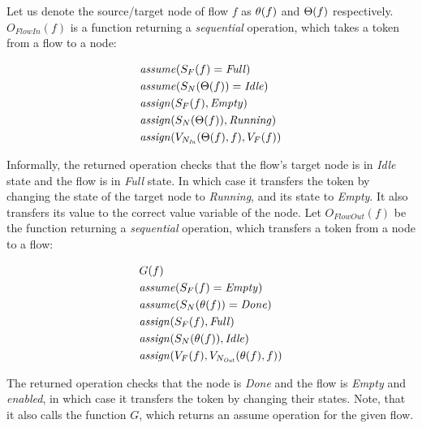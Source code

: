 \begin{definition}	
	Let us denote the source/target node of flow \(f\) as \( \theta(f) \) and \( \Theta(f) \) respectively. \(O_\mathit{FlowIn}(f)\) is a function returning a \emph{sequential} operation, which takes a token from a flow to a node:
	
	\begin{align*}
		&\mathit{assume}(S_F(f) = \mathit{Full}) \\
		&\mathit{assume}(S_N(\Theta(f)) = \mathit{Idle}) \\
		&\mathit{assign}(S_F(f), \mathit{Empty}) \\
		&\mathit{assign}(S_N(\Theta(f)), \mathit{Running}) \\
		&\mathit{assign}(V_{N_\mathit{In}}(\Theta(f), f), V_F(f)) \\
	\end{align*}

	Informally, the returned operation checks that the flow's target node is in \emph{Idle} state and the flow is in \emph{Full} state. In which case it transfers the token by changing the state of the target node to \emph{Running}, and its state to \emph{Empty}. It also transfers its value to the correct value variable of the node. Let \(O_\mathit{FlowOut}(f)\) be the function returning a \emph{sequential} operation, which transfers a token from a node to a flow:
	
	\begin{align*}
		&G(f)\\
		&\mathit{assume}(S_F(f) = \mathit{Empty}) \\
		&\mathit{assume}(S_N(\theta(f)) = \mathit{Done}) \\
		&\mathit{assign}(S_F(f), \mathit{Full}) \\
		&\mathit{assign}(S_N(\theta(f)), \mathit{Idle}) \\
		&\mathit{assign}(V_F(f), V_{N_\mathit{Out}}(\theta(f), f)) \\
	\end{align*}

	The returned operation checks that the node is \emph{Done} and the flow is \emph{Empty} and \emph{enabled}, in which case it transfers the token by changing their states. Note, that it also calls the function \(G\), which returns an assume operation for the given flow. 
\end{definition}

